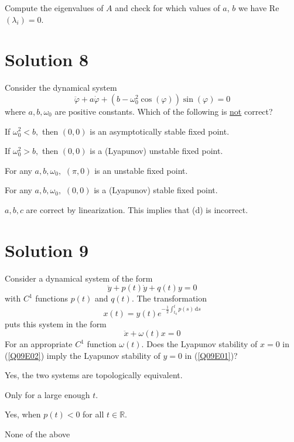 \documentclass[twoside,10pt,a4paper]{article}
\begin{document}
{\color{MyRed}Compute the eigenvalues of $A$ and check for which values of $a$, $b$ we have Re$(\lambda_i) = 0$.}

\section*{Solution 8}
Consider the dynamical system
\begin{equation*}
	\ddot{\varphi} + a\dot{\varphi} + (b - \omega_0^2 \cos(\varphi))\sin(\varphi) = 0
\end{equation*}
where $a,b,\omega_0$ are positive constants. Which of the following is \underline{not} correct?

\begin{enumerate}[label=(\alph*)]
	\item If $\omega_0^2 < b,$ then $(0,0)$ is an asymptotically stable fixed point.
	\item If $\omega_0^2 > b,$ then $(0,0)$ is a (Lyapunov) unstable fixed point.
	\item For any $a,b,\omega_0,$ $(\pi,0)$ is an unstable fixed point.
	{\color{MyRed}\item For any $a,b,\omega_0,$ $(0,0)$ is a (Lyapunov) stable fixed point.} 
\end{enumerate}

{\color{MyRed} $a,b,c$ are correct by linearization. This implies that (d) is incorrect. }

\section*{Solution 9}
Consider a dynamical system of the form
\begin{equation}\label{Q09E01}
	\ddot{y} + p(t)\dot{y} + q(t)y = 0
\end{equation}
with $C^1$ functions $p(t)$ and $q(t)$.
The transformation
\begin{equation*}
	x(t) = y(t)e^{-\frac{1}{2}\int_{t_0}^t p(s)\,\text{d}s}
\end{equation*}
puts this system in the form
\begin{equation}\label{Q09E02}
	\ddot{x} + \omega(t)x = 0
\end{equation}
For an appropriate $C^1$ function $\omega(t)$. Does the Lyapunov stability of $x = 0$ in (\ref{Q09E02}) imply the Lyapunov stability of $y = 0$ in (\ref{Q09E01})?

\begin{enumerate}[label=(\alph*)]
	{\color{MyRed}\item Yes, the two systems are topologically equivalent.}
	\item Only for a large enough $t$.
	\item Yes, when $p(t) < 0$ for all $t \in \mathbb{R}$.
	\item None of the above
\end{enumerate}
\end{document}
